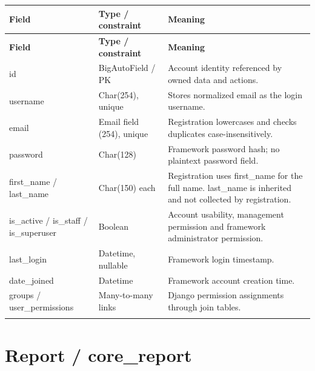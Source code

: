 \documentclass[12pt,a4paper,oneside]{report}
\begin{document}
\begin{longtable}{@{}P{0.24\dimexpr\textwidth-24pt\relax}P{0.28\dimexpr\textwidth-24pt\relax}P{0.48\dimexpr\textwidth-24pt\relax}@{}}

\toprule \textbf{Field} & \textbf{Type / constraint} & \textbf{Meaning} \\ \midrule\endfirsthead

\toprule \textbf{Field} & \textbf{Type / constraint} & \textbf{Meaning} \\ \midrule\endhead

\bottomrule\endfoot

id & BigAutoField / PK & Account identity referenced by owned data and actions. \\ \addlinespace[3pt]

username & Char(254), unique & Stores normalized email as the login username. \\ \addlinespace[3pt]

email & Email field (254), unique & Registration lowercases and checks duplicates case-insensitively. \\ \addlinespace[3pt]

password & Char(128) & Framework password hash; no plaintext password field. \\ \addlinespace[3pt]

first\_name / last\_name & Char(150) each & Registration uses first\_name for the full name. last\_name is inherited and not collected by registration. \\ \addlinespace[3pt]

is\_active / is\_staff / is\_superuser & Boolean & Account usability, management permission and framework administrator permission. \\ \addlinespace[3pt]

last\_login & Datetime, nullable & Framework login timestamp. \\ \addlinespace[3pt]

date\_joined & Datetime & Framework account creation time. \\ \addlinespace[3pt]

groups / user\_permissions & Many-to-many links & Django permission assignments through join tables. \\ \addlinespace[3pt]

\end{longtable}


\section{Report / core\_report}
\end{document}
